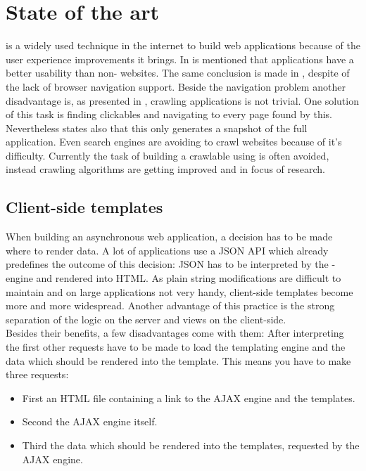 \section{State of the art}
\ajax{} is a widely used technique in the internet to build web applications because of the user experience improvements it brings.
In \cite{roodt2006effect} is mentioned that \ajax{} applications have a better usability than non-\ajax{} websites.
The same conclusion is made in \cite{kluge2007effects}, despite of the lack of browser navigation support.
Beside the navigation problem another disadvantage is, as presented in \cite{mesbah2009analysis}, crawling \ajax{} applications is not trivial.
One solution of this task is finding clickables and navigating to every page found by this.
Nevertheless \cite{mesbah2009analysis} states also that this only generates a snapshot of the full application.
Even search engines are avoiding to crawl websites because of it's difficulty\cite{duda2009ajax}.
Currently the task of building a crawlable \singlePageApplication{} using \ajax{} is often avoided, instead crawling algorithms are getting improved and in focus of research.

\subsection{Client-side templates\label{clientSideTemplates}}
When building an asynchronous web application, a decision has to be made where to render data.
A lot of \ajax{} applications use a JSON API which already predefines the outcome of this decision:
JSON has to be interpreted by the \ajax{}-engine and rendered into HTML.
As plain string modifications are difficult to maintain and on large applications not very handy, client-side templates become more and more widespread.
Another advantage of this practice is the strong separation of the logic on the server and views on the client-side.
\\
Besides their benefits, a few disadvantages come with them:
After interpreting the first \httpRequest{} other requests have to be made to load the templating engine and the data which should be rendered into the template.
This means you have to make three requests:
\begin{itemize}
    \item First an HTML file containing a link to the AJAX engine and the templates.
    \item Second the AJAX engine itself.
    \item Third the data which should be rendered into the templates, requested by the AJAX engine.
\end{itemize}

